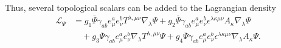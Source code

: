 \documentclass[twocolumn,aps,
  showpacs,showkeys,prd,superscriptaddress]{revtex4-1}
\renewcommand{\(}{\left(}
\renewcommand{\)}{\right)}
\renewcommand{\[}{\left[}
\renewcommand{\]}{\right]}
\begin{document}
Thus, several topological scalars can be added to the Lagrangian density
\begin{equation}
  \label{SpinorLagrangian}
  \begin{split}
    \mathcal{L}_\Psi &= g_1 \bar\Psi\gamma_{ab}e^a_{\mu}e^b_{\nu}T^{\lambda,\mu\nu}\nabla_\lambda\Psi
    +g_2 \bar\Psi\gamma_{ab}e^a_{\mu}e^b_{\nu}\epsilon^{\lambda\kappa\mu\nu}A_\kappa\nabla_\lambda\Psi \\
    & \quad +g_3 \bar\Psi\gamma_{ab}e^a_{\mu}e^b_{\nu}\nabla_\lambda T^{\lambda,\mu\nu}\Psi
    +g_4 \bar\Psi\gamma_{ab}e^a_{\mu}e^b_{\nu}\epsilon^{\lambda\kappa\mu\nu}\nabla_\lambda A_\kappa\Psi.
  \end{split}
\end{equation}





\end{document}
